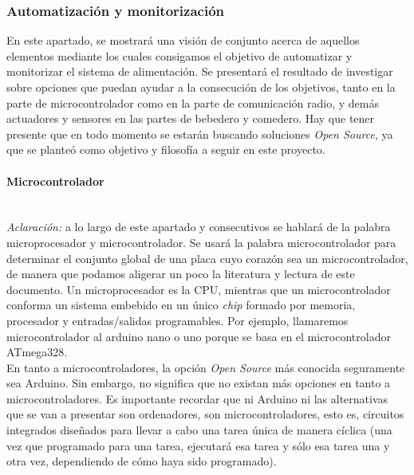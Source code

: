 \documentclass[12pt]{article}
\newcommand{\subsubsubsection}[1]{\paragraph{#1}\mbox{}\\}
\begin{document}
	
	
	
	
	\subsubsection{Automatización y monitorización}
	\label{subsección 3.2.2: automatización y monitorización}
	
	\noindent En este apartado, se mostrará una visión de conjunto acerca de aquellos elementos mediante los cuales consigamos el objetivo de automatizar y monitorizar el sistema de alimentación. Se presentará el resultado de investigar sobre opciones que puedan ayudar a la consecución de los objetivos, tanto en la parte de microcontrolador como en la parte de comunicación radio, y demás actuadores y sensores en las partes de bebedero y comedero. Hay que tener presente que en todo momento se estarán buscando soluciones \textit{Open Source}, ya que se planteó como objetivo y filosofía a seguir en este proyecto.\\
	
	\subsubsubsection{Microcontrolador}
	
	\noindent \textit{Aclaración:} a lo largo de este apartado y consecutivos se hablará de la palabra microprocesador y microcontrolador. Se usará la palabra microcontrolador para determinar el conjunto global de una placa cuyo corazón sea un microcontrolador, de manera que podamos aligerar un poco la literatura y lectura de este documento. Un microprocesador es la CPU, mientras que un microcontrolador conforma un sistema embebido en un único \textit{chip} formado por memoria, procesador y entradas/salidas programables. Por ejemplo, llamaremos microcontrolador al arduino nano o uno porque se basa en el microcontrolador ATmega328.\\
	
	\noindent En tanto a microcontroladores, la opción \textit{Open Source} más conocida seguramente sea Arduino. Sin embargo, no significa que no existan más opciones en tanto a microcontroladores. Es importante recordar que ni Arduino ni las alternativas que se van a presentar son ordenadores, son microcontroladores, esto es, circuitos integrados diseñados para llevar a cabo una tarea única de manera cíclica (una vez que programado para una tarea, ejecutará esa tarea y sólo esa tarea una y otra vez, dependiendo de cómo haya sido programado).\\
	
\end{document}
